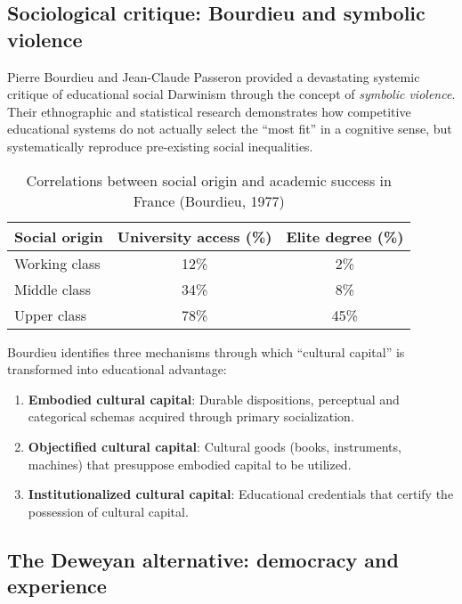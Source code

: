 \subsection{Sociological critique: Bourdieu and symbolic violence}

Pierre Bourdieu and Jean-Claude Passeron \cite{Bourdieu1977} provided a devastating systemic critique of educational social Darwinism through the concept of \textit{symbolic violence}. Their ethnographic and statistical research demonstrates how competitive educational systems do not actually select the ``most fit'' in a cognitive sense, but systematically reproduce pre-existing social inequalities.

\begin{table}[h]
	\centering
	\caption{Correlations between social origin and academic success in France (Bourdieu, 1977)}
	\label{tab:bourdieu-correlations}
	\begin{tabular}{lcc}
		\toprule
		\textbf{Social origin} & \textbf{University access (\%)} & \textbf{Elite degree (\%)} \\
		\midrule
		Working class & 12\% & 2\% \\
		Middle class & 34\% & 8\% \\
		Upper class & 78\% & 45\% \\
		\bottomrule
	\end{tabular}
\end{table}

Bourdieu identifies three mechanisms through which ``cultural capital'' is transformed into educational advantage:

\begin{enumerate}
	\item \textbf{Embodied cultural capital}: Durable dispositions, perceptual and categorical schemas acquired through primary socialization.
	\item \textbf{Objectified cultural capital}: Cultural goods (books, instruments, machines) that presuppose embodied capital to be utilized.
	\item \textbf{Institutionalized cultural capital}: Educational credentials that certify the possession of cultural capital.
\end{enumerate}

\subsection{The Deweyan alternative: democracy and experience}

